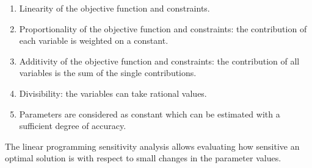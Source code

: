 \documentclass[12pt, a4paper]{report}
\begin{document}
    \begin{enumerate}
        \item Linearity of the objective function and constraints. 
        \item Proportionality of the objective function and constraints: the contribution of each variable is weighted on a constant. 
        \item Additivity of the objective function and constraints: the contribution of all variables is the sum of the single 
            contributions.
        \item Divisibility: the variables can take rational values. 
        \item Parameters are considered as constant which can be estimated with a sufficient degree of accuracy. 
    \end{enumerate}
    The linear programming sensitivity analysis allows evaluating how sensitive an optimal solution is with respect to small changes in 
    the parameter values. 
\end{document}
